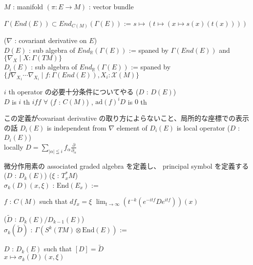 \begin{When}
\itemwhen
  \Fix \(M\) : manifold
  \Fix \((\pi : E \to M)\) : vector bundle
\end{When}

\begin{Definition}
\itemdefi
  \Define \(\Gamma(End(E)) \subset End_{C(M)}(\Gamma(E))\) := \(s \mapsto (t \mapsto (x \mapsto s(x)(t(x))))\)
\end{Definition}

\begin{Definition}
\itemdefi
  \For (\(\nabla\) : covariant derivative on \(E\)) \\
  \Define \(D(E)\) : sub algebra of \(End_{\mathbb{R}}(\Gamma(E))\) :=
    spaned by \(\Gamma(End(E))\) and \(\{\nabla_X \mid X : \Gamma(TM)\}\) \\
  \Define \(D_i(E)\) : sub algebra of \(End_{\mathbb{R}}(\Gamma(E))\) :=
    spaned by \(\{f \nabla_{X_1} \cdots \nabla_{X_i} \mid f : \Gamma(End(E)) , X_i : \mathcal{X}(M)\}\) \\
\end{Definition}

\begin{Theorem}
\itemnote
  \(i\) th operator の必要十分条件についてやる
\itemprop
  \For (\(D\) : \(D(E)\)) \\
  \(D\) is \(i\) th \(iff\) \(\forall\) (\(f\) : \(C(M)\)) , \(\text{ad}(f) ^i D\) is \(0\) th
\end{Theorem}

\begin{Theorem}
\itemnote
  この定義がcovariant derivative の取り方によらないこと、局所的な座標での表示の話
\itemprop
  \(D_i(E)\) is independent from \(\nabla\)
\itemprop
  element of \(D_i(E)\) is local operator
\itemprop
  \For (\(D\) : \(D_i(E)\)) \\
  \Then locally \(D = \sum_{\left| \alpha \right| \leqq i} f_{\alpha} \frac{\partial}{\partial_{\alpha}}\)
\end{Theorem}

\begin{Definition}
\itemnote
  微分作用素の associated graded algebra を定義し、 principal symbol を定義する
\itemdefi
  \For (\(D\) : \(D_k(E)\)) (\(\xi\) : \(T^*_x M\)) \\
  \Define \(\sigma_k(D)(x , \xi)\) : \(\text{End}(E_x)\) :=
  \begin{indentblock}
    \Take \(f\) : \(C(M)\) such that \(df_x = \xi\)
    \Return \(\lim_{t \to \infty} (t^{-k}(e^{-itf} D e^{itf}))(x)\) \\
  \end{indentblock}
\itemdefi
  \For (\(\tilde{D}\) : \(D_k(E) / D_{k - 1}(E)\)) \\
  \Define \(\sigma_k(\tilde{D})\) : \(\Gamma(S^k(TM) \otimes \text{End}(E))\) := \\
  \begin{indentblock}
    \Take \(D\) : \(D_k(E)\) such that \([D] = \tilde{D}\) \\
    \Return \(x \mapsto \sigma_k(D)(x , \xi)\)
  \end{indentblock}
\end{Definition}


